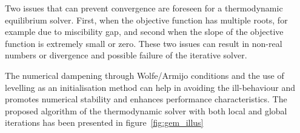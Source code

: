 	Two issues that can prevent convergence are foreseen for a thermodynamic equilibrium solver. First, when the objective function has multiple roots, for example due to miscibility gap, and second when the slope of the objective function is extremely small or zero. These two issues can result in non-real numbers or divergence and possible failure of the iterative solver.

	The numerical dampening through Wolfe/Armijo conditions and the use of levelling as an initialisation method can help in avoiding the ill-behaviour and promotes numerical stability and enhances performance characteristics. The proposed algorithm of the thermodynamic solver with both local and global iterations has been presented in figure~\ref{fig:gem_illus}

\begin{landscape}
\thispagestyle{empty}


\end{landscape}
